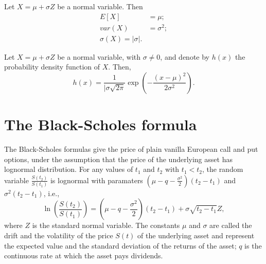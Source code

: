 \begin{lemma}
    Let $ X = \mu + \sigma Z $ be a normal variable.
    Then
    \begin{align}
        E[X] &= \mu; \\
        var(X) &= \sigma^2; \\
        \sigma(X) = | \sigma |.
    \end{align}
\end{lemma}

\begin{lemma}
    Let $ X = \mu + \sigma Z $ be a normal variable, with $ \sigma \neq 0 $, and
        denote by $ h(x) $ the probability density function of $ X $.
    Then,
    \begin{equation}
        h(x) = \frac{1}{| \sigma  \sqrt{2 \pi}} \exp \left(
            -\frac{(x - \mu)^2}{2 \sigma^2} \right).
    \end{equation}
\end{lemma}

\section{The Black-Scholes formula}
The Black-Scholes formulas give the price of plain vanilla European call and put
    options, under the assumption that the price of the underlying asset has
    lognormal distribution.
For any values of $ t_1 $ and $ t_2 $ with $ t_1 < t_2 $, the random variable
    $ \frac{S(t_2)}{S(t_1)} $ is lognormal with paramaters
    $ \left( \mu - q - \frac{\sigma^2}{2} \right) (t_2 - t_1) $ and
    $ \sigma^2 (t_2 - t_1) $, i.e.,
\begin{equation}
    \ln \left( \frac{S(t_2)}{S(t_1)} \right) = \left( \mu - q -
        \frac{\sigma^2}{2} \right) (t_2 - t_1) + \sigma \sqrt{t_2 - t_1} Z,
\end{equation}
where $ Z $ is the standard normal variable.
The constants $ \mu $ and $ \sigma $ are called the drift and the volatility of
    the price $ S(t) $ of the underlying asset and represent the expected value
    and the standard deviation of the returns of the asset; $ q $ is the
    continuous rate at which the asset pays dividends.

